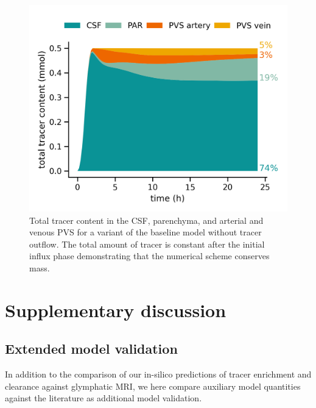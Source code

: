\begin{figure}
    \centering
    \includegraphics[width=0.5\linewidth]{figures/modelAMassConservation_total_conc.png}
    \caption{Total tracer content in the CSF, parenchyma, and arterial and venous PVS for a variant of the baseline model without tracer outflow. The total amount of tracer is constant after the initial influx phase demonstrating that the numerical scheme conserves mass.}
    \label{fig:mass_conservation}
\end{figure}

\section{Supplementary discussion}

\subsection{Extended model validation}
\label{sec:app:model_validation}

In addition to the comparison of our in-silico predictions of tracer
enrichment and clearance against glymphatic MRI, we here compare
auxiliary model quantities against the literature as additional model
validation.

